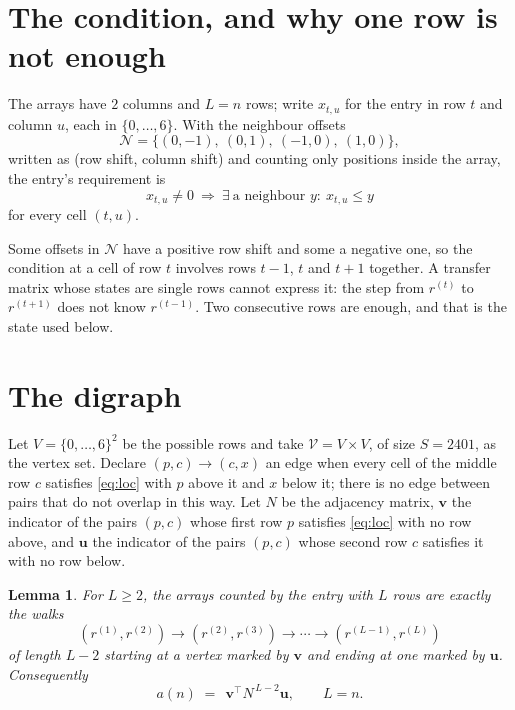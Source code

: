 \documentclass[11pt,a4paper]{article}
\theoremstyle{plain}
\newtheorem{lemma}[theorem]{Lemma}
\theoremstyle{definition}
\begin{document}
\section{The condition, and why one row is not enough}

The arrays have $2$ columns and $L=n$ rows; write $x_{t,u}$ for the entry in
row $t$ and column $u$, each in $\{0,\dots,6\}$. With the neighbour offsets
\[
\mathcal N=\{(0,-1),\ (0,1),\ (-1,0),\ (1,0)\},
\]
written as (row shift, column shift) and counting only positions inside the array, the
entry's requirement is
\begin{equation}\label{eq:loc}
x_{t,u}\ne0\ \Rightarrow\ \exists\ \text{a neighbour }y:\ x_{t,u}\le y
\end{equation}
for every cell $(t,u)$.

Some offsets in $\mathcal N$ have a positive row shift and some a negative one, so the
condition at a cell of row $t$ involves rows $t-1$, $t$ and $t+1$ together. A transfer
matrix whose states are single rows cannot express it: the step from $r^{(t)}$ to
$r^{(t+1)}$ does not know $r^{(t-1)}$. Two consecutive rows are enough, and that is
the state used below.

\section{The digraph}

Let $V=\{0,\dots,6\}^{2}$ be the possible rows and take
$\mathcal V=V\times V$, of size $S=2401$, as the vertex set. Declare $(p,c)\to(c,x)$ an edge
when every cell of the middle row $c$ satisfies \eqref{eq:loc} with $p$ above it and $x$
below it; there is no edge between pairs that do not overlap in this way. Let $N$ be the
adjacency matrix, $\mathbf{v}$ the indicator of the pairs $(p,c)$ whose first row $p$
satisfies \eqref{eq:loc} with no row above, and $\mathbf{u}$ the indicator of
the pairs $(p,c)$ whose second row $c$ satisfies it with no row below.

\begin{lemma}\label{lem:walk}
For $L\ge2$, the arrays counted by the entry with $L$ rows are exactly the walks
\[
(r^{(1)},r^{(2)})\to(r^{(2)},r^{(3)})\to\cdots\to(r^{(L-1)},r^{(L)})
\]
of length $L-2$ starting at a vertex marked by $\mathbf{v}$ and ending at one marked by
$\mathbf{u}$. Consequently
\[
a(n)\;=\;\,\mathbf{v}^{\!\top}N^{\,L-2}\mathbf{u},\qquad L=n .
\]
\end{lemma}
\end{document}
